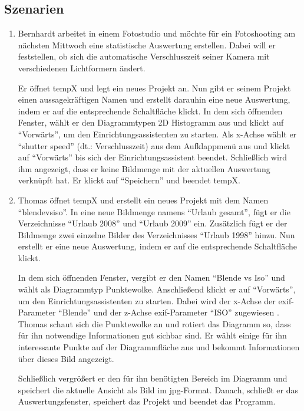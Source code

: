 \subsection{Szenarien}

\begin{enumerate}
	\item Bernhardt arbeitet in einem Fotostudio und möchte für ein Fotoshooting am nächsten Mittwoch eine statistische Auswertung erstellen. Dabei will er feststellen, ob sich die automatische Verschlusszeit seiner Kamera mit verschiedenen \gls{Lichtformer}n ändert.\par
	Er öffnet \gls{tempX} und legt ein neues Projekt an. Nun gibt er seinem Projekt einen aussagekräftigen Namen und erstellt darauhin eine neue Auswertung, indem er auf die entsprechende Schaltfläche klickt. In dem sich öffnenden Fenster, wählt er den Diagrammtypen 2D Histogramm aus und klickt auf "`Vorwärts"', um den Einrichtungsassistenten zu starten. Als x-Achse wählt er "`shutter speed"' (dt.: Verschlusszeit) aus dem Aufklappmenü aus und klickt auf "`Vorwärts"' bis sich der Einrichtungsassistent beendet. Schließlich wird ihm angezeigt, dass er keine Bildmenge mit der aktuellen Auswertung verknüpft hat. Er klickt auf "`Speichern"' und beendet \gls{tempX}. 

	\item Thomas öffnet \gls{tempX} und erstellt ein neues Projekt mit dem Namen "`blendevsiso"'. In eine neue Bildmenge namens "`Urlaub gesamt"', fügt er die Verzeichnisse "`Urlaub 2008"' und "`Urlaub 2009"' ein. Zusätzlich fügt er der Bildmenge zwei einzelne Bilder des Verzeichnisses "`Urlaub 1998"' hinzu.	Nun erstellt er eine neue Auswertung, indem er auf die entsprechende Schaltfläche klickt.\par
	In dem sich öffnenden Fenster, vergibt er den Namen "`Blende vs Iso"' und wählt als Diagrammtyp Punktewolke. Anschließend klickt er auf "`Vorwärts"', um den Einrichtungsassistenten zu starten. Dabei wird der x-Achse der \gls{exif}-Parameter "`Blende"' und der z-Achse \gls{exif}-Parameter "`ISO"' zugewiesen . Thomas schaut sich die Punktewolke an und rotiert das Diagramm so, dass für ihn notwendige Informationen gut sichbar sind. Er wählt einige für ihn interessante Punkte auf der Diagrammfläche aus und bekommt Informationen über dieses Bild angezeigt.\par
	Schließlich vergrößert er den für ihn benötigten Bereich im Diagramm und speichert die aktuelle Ansicht als Bild im \gls{jpg}-Format. Danach, schließt er das Auswertungsfenster, speichert das Projekt und beendet das Programm.


\end{enumerate}
